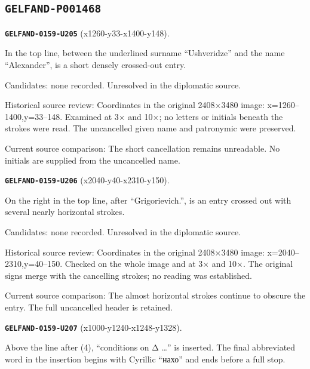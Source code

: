 \subsection*{\texttt{GELFAND-P001468}}
\par\noindent\leavevmode{}\label{GELFAND-0159-U205}\label{GELFAND-P001468:x1260-y33-x1400-y148}\textbf{\texttt{GELFAND-0159-U205}} (x1260-y33-x1400-y148).\nopagebreak[4]\par
In the top line, between the underlined surname “Ushveridze” and the name “Alexander”, is a short densely crossed-out entry.\par
Candidates: none recorded. Unresolved in the diplomatic source.\par
Historical source review: Coordinates in the original 2408×3480 image: x=1260–1400,y=33–148. Examined at 3× and 10×; no letters or initials beneath the strokes were read. The uncancelled given name and patronymic were preserved.\par
Current source comparison: The short cancellation remains unreadable. No initials are supplied from the uncancelled name.\par\medskip
\par\noindent\leavevmode{}\label{GELFAND-0159-U206}\label{GELFAND-P001468:x2040-y40-x2310-y150}\textbf{\texttt{GELFAND-0159-U206}} (x2040-y40-x2310-y150).\nopagebreak[4]\par
On the right in the top line, after “Grigorievich.”, is an entry crossed out with several nearly horizontal strokes.\par
Candidates: none recorded. Unresolved in the diplomatic source.\par
Historical source review: Coordinates in the original 2408×3480 image: x=2040–2310,y=40–150. Checked on the whole image and at 3× and 10×. The original signs merge with the cancelling strokes; no reading was established.\par
Current source comparison: The almost horizontal strokes continue to obscure the entry. The full uncancelled header is retained.\par\medskip
\par\noindent\leavevmode{}\label{GELFAND-0159-U207}\label{GELFAND-P001468:x1000-y1240-x1248-y1328}\textbf{\texttt{GELFAND-0159-U207}} (x1000-y1240-x1248-y1328).\nopagebreak[4]\par
Above the line after (4), “conditions on Δ …” is inserted. The final abbreviated word in the insertion begins with Cyrillic “нахо” and ends before a full stop.\par
